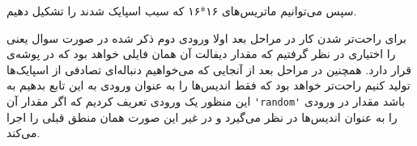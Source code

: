 \documentclass[12pt,onecolumn,a4paper,fleqn]{article}
\begin{document}
سپس می‌توانیم ماتریس‌های ۱۶*۱۶ که سبب اسپایک شدند را تشکیل دهیم.

برای راحت‌تر شدن کار در مراحل بعد اولا ورودی دوم ذکر شده در صورت سوال یعنی  را اختیاری در نظر گرفتیم که مقدار دیفالت آن همان فایلی خواهد بود که در پوشه‌ی  قرار دارد. همچنین در مراحل بعد از آنجایی که می‌خواهیم دنباله‌ای تصادفی از اسپایک‌ها تولید کنیم راحت‌تر خواهد بود که فقط اندیس‌ها را به عنوان ورودی به این تابع بدهیم به این منظور یک ورودی  تعریف کردیم که اگر مقدار آن 
\lstinline[style=Matlab-editor, tabsize=2]{'random'}
باشد مقدار  در ورودی را به عنوان اندیس‌ها در نظر می‌گیرد و در غیر این صورت همان منطق قبلی را اجرا می‌کند.
		 

		
\end{document}
